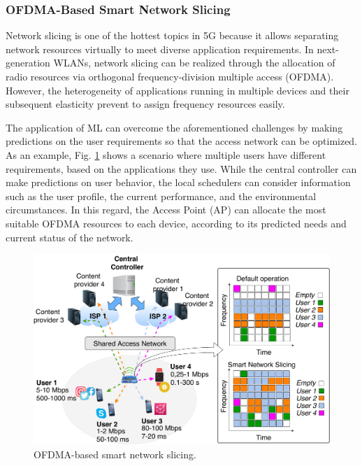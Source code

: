 \documentclass[journal]{IEEEtran}
\begin{document}
\subsubsection{OFDMA-Based Smart Network Slicing} 
Network slicing is one of the hottest topics in 5G because it allows separating network resources virtually to meet diverse application requirements. In next-generation WLANs, network slicing can be realized through the allocation of radio resources via orthogonal frequency-division multiple access (OFDMA). However, the heterogeneity of applications running in multiple devices and their subsequent elasticity prevent to assign frequency resources easily. 

The application of ML can overcome the aforementioned challenges by making predictions on the user requirements so that the access network can be optimized. As an example, Fig. \ref{fig:use_cases} shows a scenario where multiple users have different requirements, based on the applications they use. While the central controller can make predictions on user behavior, the local schedulers can consider information such as the user profile, the current performance, and the environmental circumstances. In this regard, the Access Point (AP) can allocate the most suitable OFDMA resources to each device, according to its predicted needs and current status of the network.

\begin{figure}[ht!]
	\centering
	\includegraphics[width=1\columnwidth]{network_slicing_ofdma}
	\caption{OFDMA-based smart network slicing.}
	\label{fig:use_cases}
\end{figure}
\end{document}
